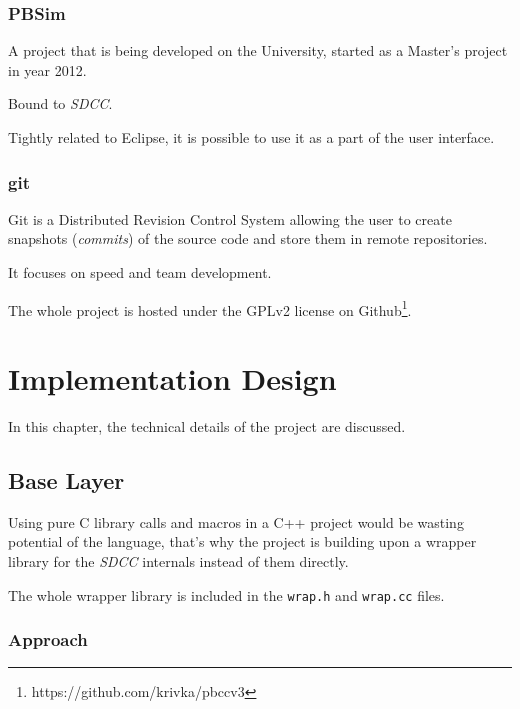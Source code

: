         \subsection{PBSim}\label{pbsim}


        A project that is being developed on the University, started as a Master's project in year 2012.

        Bound to \emph{SDCC}.

        Tightly related to Eclipse, it is possible to use it as a part of the user interface.

        \subsection{git}\label{git}

        Git is a Distributed Revision Control System allowing the user to create snapshots (\emph{commits}) of the source code and store them in remote repositories.

        It focuses on speed and team development. 

        The whole project is hosted under the GPLv2 license on Github\footnote{https://github.com/krivka/pbccv3}.

        


\chapter{Implementation Design}\label{design}

In this chapter, the technical details of the project are discussed.


    \section{Base Layer}

    Using pure C library calls and macros in a C++ project would be wasting potential of the language, that's why the project is building upon a wrapper library for the \emph{SDCC} internals instead of them directly.

    The whole wrapper library is included in the \texttt{wrap.h} and \texttt{wrap.cc} files.

        \subsection{Approach}

